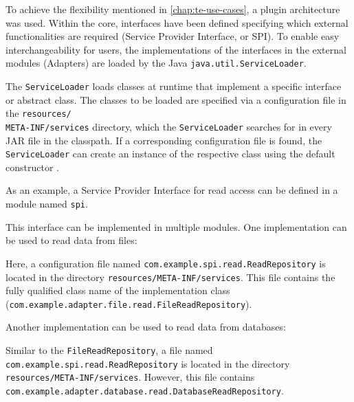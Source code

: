 To achieve the flexibility mentioned in \autoref{chap:te-use-cases}, a plugin architecture was used.
Within the core, interfaces have been defined specifying which external functionalities are required (Service Provider Interface, or SPI).
To enable easy interchangeability for users, the implementations of the interfaces in the external modules (Adapters) are loaded by the Java \texttt{java.util.ServiceLoader}.

The \texttt{ServiceLoader} loads classes at runtime that implement a specific interface or abstract class.
The classes to be loaded are specified via a configuration file in the \texttt{resources/}\\\texttt{META-INF/services} directory, which the \texttt{ServiceLoader} searches for in every JAR file in the classpath.
If a corresponding configuration file is found, the \texttt{ServiceLoader} can create an instance of the respective class using the default constructor \cite{java-service-loader}.

As an example, a Service Provider Interface for read access can be defined in a module named \texttt{spi}.



\noindent
This interface can be implemented in multiple modules.
One implementation can be used to read data from files:



\noindent
Here, a configuration file named \texttt{com.example.spi.read.ReadRepository} is located in the directory \texttt{resources/META-INF/services}.
This file contains the fully qualified class name of the implementation class (\texttt{com.example.adapter.file.read.}\texttt{FileReadRepository}).

\newpage
Another implementation can be used to read data from databases:



\noindent
Similar to the \texttt{FileReadRepository}, a file named \texttt{com.example.spi.read.ReadRepository} is located in the directory \texttt{resources/META-INF/services}.
However, this file contains \texttt{com.example.adapter.database.read.DatabaseReadRepository}.

